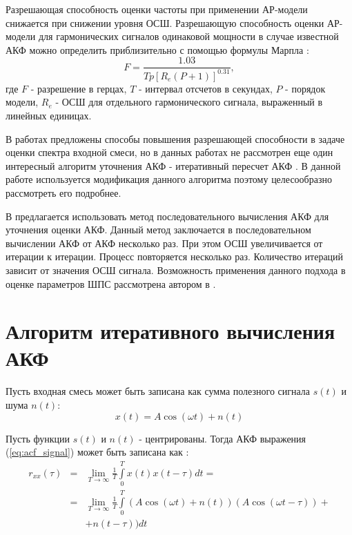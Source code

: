 Разрешающая способность оценки частоты при применении АР-модели снижается при снижении уровня ОСШ.
Разрешающую способность оценки АР-модели для гармонических сигналов
одинаковой мощности в случае известной АКФ можно определить приблизительно с помощью формулы Марпла \cite{marpl_book, kay_ar_book}:
\begin{equation}
	\label{eq:lpc_est_quality_1}
	F = \frac{1.03}{Tp[R_e(P+1)]^{0.31}},
\end{equation}
где ${F}$ - разрешение в герцах, ${T}$ - интервал отсчетов в секундах, ${P}$ - порядок модели, ${R_e}$ - ОСШ для отдельного гармонического сигнала, выраженный в линейных единицах.

В работах \cite{lacoss_spectral_est, chen_spectral_est, marple_1977} предложены способы повышения разрешающей способности в задаче оценки спектра входной смеси, но
в данных работах не рассмотрен еще один интересный алгоритм уточнения АКФ - итеративный пересчет АКФ \cite{ostanin_akf}. В данной работе используется
модификация данного алгоритма поэтому целесообразно рассмотреть его подробнее.

В \cite{ostanin_akf} предлагается использовать метод последовательного вычисления АКФ для уточнения оценки АКФ. Данный метод
заключается в последовательном вычислении АКФ от АКФ несколько раз. При этом ОСШ увеличивается от итерации к итерации.
Процесс повторяется несколько раз. Количество итераций зависит от значения ОСШ сигнала. Возможность применения данного подхода в оценке параметров ШПС рассмотрена
автором в \cite{my_acf_cdma}.

\section{Алгоритм итеративного вычисления АКФ}
\label{sec_ostanin}

Пусть входная смесь может быть записана как сумма полезного сигнала ${s(t)}$ и шума ${n(t)}$:
\begin{equation}
	\label{eq:acf_signal}
	x(t) = A \cos{(\omega t)} + n(t)
\end{equation}

Пусть функции ${s(t)}$ и ${n(t)}$ - центрированы. Тогда АКФ выражения (\ref{eq:acf_signal}) может быть записана как \cite{book_max}:
\begin{eqnarray}
	\label{eq:acf_rss_signal}
	r_{xx}(\tau)	& = & \lim_{T \to \infty} \frac{1}{T} \int \limits_0^T x(t)x(t-\tau)dt = \nonumber \\
			& = & \lim_{T \to \infty} \frac{1}{T} \int \limits_0^T (A \cos{(\omega t)} + n(t))(A \cos{(\omega t - \tau)}) + \\
			&   & + n(t - \tau))dt \nonumber
\end{eqnarray}

